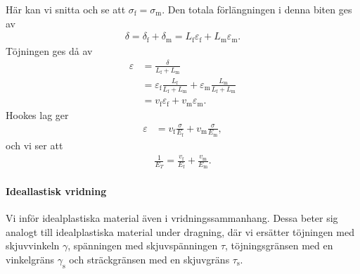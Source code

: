 Här kan vi snitta och se att $\sigma_{\text{f}} = \sigma_{\text{m}}$. Den totala förlängningen i denna biten ges av
\begin{align*}
	\delta = \delta_{\text{f}} + \delta_{\text{m}} = L_{\text{f}}\varepsilon_{\text{f}} + L_{\text{m}}\varepsilon_{\text{m}}.
\end{align*}
Töjningen ges då av
\begin{align*}
	\varepsilon &= \frac{\delta}{L_{\text{f}} + L_{\text{m}}} \\
	            &= \varepsilon_{\text{f}}\frac{L_{\text{f}}}{L_{\text{f}} + L_{\text{m}}} + \varepsilon_{\text{m}}\frac{L_{\text{m}}}{L_{\text{f}} + L_{\text{m}}} \\
	            &= v_{\text{f}}\varepsilon_{\text{f}} + v_{\text{m}}\varepsilon_{\text{m}}.
\end{align*}
Hookes lag ger
\begin{align*}
	\varepsilon &= v_{\text{f}}\frac{\sigma}{E_{\text{f}}} + v_{\text{m}}\frac{\sigma}{E_{\text{m}}},
\end{align*}
och vi ser att
\begin{align*}
	\frac{1}{E_{T}} = \frac{v_{\text{f}}}{E_{\text{f}}} + \frac{v_{\text{m}}}{E_{\text{m}}}.
\end{align*}

\paragraph{Ideallastisk vridning}
Vi inför idealplastiska material även i vridningssammanhang. Dessa beter sig analogt till idealplastiska material under dragning, där vi ersätter töjningen med skjuvvinkeln $\gamma$, spänningen med skjuvspänningen $\tau$, töjningsgränsen med en vinkelgräns $\gamma_{\text{s}}$ och sträckgränsen med en skjuvgräns $\tau_{\text{s}}$.